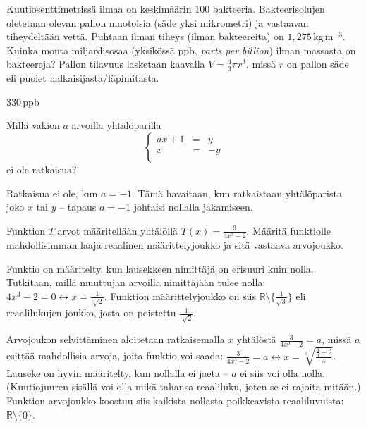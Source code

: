 \begin{tehtava}
Kuutiosenttimetrissä ilmaa on keskimäärin $100$ bakteeria. Bakteerisolujen oletetaan olevan pallon muotoisia (säde yksi mikrometri) ja vastaavan tiheydeltään vettä. Puhtaan ilman tiheys (ilman bakteereita) on $1,275$\,kg\,m$^{-3}$. Kuinka monta miljardisosaa (yksikössä ppb, \textit{parts per billion}) ilman massasta on bakteereja? Pallon tilavuus lasketaan kaavalla $V=\frac{4}{3}\pi r^3$, missä $r$ on pallon säde eli puolet halkaisijasta/läpimitasta.
	\begin{vastaus}
	$330$\,ppb %
	\end{vastaus}
\end{tehtava}	

\begin{tehtava}
Millä vakion $a$ arvoilla yhtälöparilla 
$$\left\{    
    \begin{array}{rcl}
        ax+1&=&y \\
        x&=&-y \\
    \end{array}
    \right. $$
    ei ole ratkaisua?
	\begin{vastaus}
Ratkaisua ei ole, kun $a=-1$. Tämä havaitaan, kun ratkaistaan yhtälöparista joko $x$ tai $y$ -- tapaus $a=-1$ johtaisi nollalla jakamiseen.
	\end{vastaus}
\end{tehtava}
	
	\begin{tehtava}
Funktion $T$ arvot määritellään yhtälöllä $T(x)=\frac{3}{4x^3-2}$. Määritä funktiolle mahdollisimman laaja reaalinen määrittelyjoukko ja sitä vastaava arvojoukko.
	\begin{vastaus}
Funktio on määritelty, kun lausekkeen nimittäjä on erisuuri kuin nolla. Tutkitaan, millä muuttujan arvoilla nimittäjään tulee nolla: $4x^3-2=0 \leftrightarrow x=\frac{1}{\sqrt[3]{2}}$. Funktion määrittelyjoukko on siis $\mathbb{R}\setminus\lbrace\frac{1}{\sqrt{3}} \rbrace$ eli reaalilukujen joukko, josta on poistettu $\frac{1}{\sqrt[3]{2}}$.

Arvojoukon selvittäminen aloitetaan ratkaisemalla $x$ yhtälöstä $\frac{3}{4x^3-2}=a$, missä $a$ esittää mahdollisia arvoja, joita funktio voi saada: $\frac{3}{4x^3-2}=a \leftrightarrow x= \sqrt[3]{\frac{\frac{3}{a}+2}{4}}$. Lauseke on hyvin määritelty, kun nollalla ei jaeta -- $a$ ei siis voi olla nolla. (Kuutiojuuren sisällä voi olla mikä tahansa reaaliluku, joten se ei rajoita mitään.) Funktion arvojoukko koostuu siis kaikista nollasta poikkeavista reaaliluvuista: $\mathbb{R}\setminus \lbrace 0 \rbrace$.
	\end{vastaus}
	\end{tehtava}

